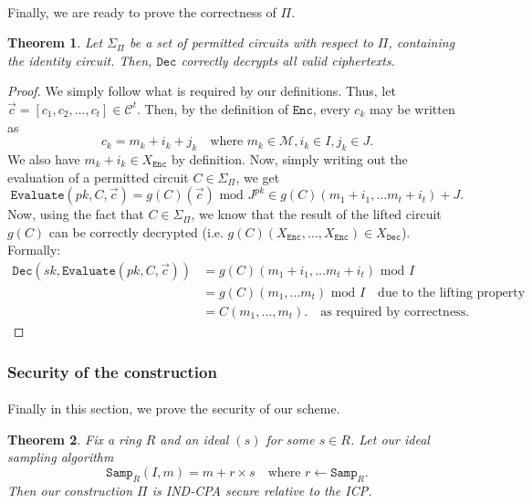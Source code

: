 \documentclass{article}
\newtheorem{theorem}{Theorem}[section]
\theoremstyle{definition}
\theoremstyle{example}
\newcommand{\Enc}{\texttt{Enc}}
\newcommand{\Dec}{\texttt{Dec}}
\newcommand{\Evaluate}{\texttt{Evaluate}}
\newcommand{\M}{\mathcal{M}}
\renewcommand{\C}{\mathcal{C}}
\renewcommand{\mod}{\,\,\text{mod}\,\,}
\newcommand{\Samp}{\texttt{Samp}}
\begin{document}
\paragraph{} Finally, we are ready to prove the correctness of $\Pi$.
\begin{theorem}
  Let $\Sigma_\Pi$ be a set of permitted circuits with respect to $\Pi$,
  containing the identity circuit. Then, $\Dec$ correctly decrypts all valid ciphertexts.
\end{theorem}
\begin{proof}
  We simply follow what is required by our definitions.
  Thus, let $\vec{c} = [c_1, c_2, \hdots, c_t] \in \C^t$. Then, by the
  definition of $\Enc$, every $c_k$ may be written as
  \[
    c_k = m_k + i_k + j_k\quad\text{where }m_k \in \M, i_k \in I, j_k \in J.
  \]
  We also have $m_k + i_k \in X_\Enc$ by definition. Now, simply writing out the
  evaluation of a permitted circuit $C \in \Sigma_\Pi$, we get
  \[
    \Evaluate(pk, C, \vec{c}) = g(C)(\vec{c}) \mod J^{pk} \in g(C)(m_1 + i_1,
    \hdots m_t + i_t) + J.
  \]
  Now, using the fact that $C \in \Sigma_\Pi$, we know that the result of the lifted circuit
  $g(C)$ can be correctly decrypted (i.e. $g(C)(X_\Enc, \hdots, X_\Enc) \in X_\Dec$). Formally:
  \begin{align*}
    \Dec(sk, \Evaluate(pk, C, \vec{c})) &= g(C)(m_1 + i_1,
                                          \hdots m_t + i_t) \mod I \\
                                        &= g(C)(m_1, \hdots m_t) \mod I\quad\text{due to the lifting property} \\
                                        &= C(m_1, \hdots, m_t).\quad \text{as required by correctness.}
  \end{align*}
\end{proof}
\subsubsection{Security of the construction}
\paragraph{} Finally in this section, we prove the security of our scheme.
\begin{theorem}
Fix a ring $R$ and an ideal $(s)$ for some $s \in R$. Let our ideal sampling algorithm
\[
  \Samp_R(I, m) = m + r \times s\quad\text{where } r \leftarrow \Samp_R.
\]
Then our construction $\Pi$ is IND-CPA secure relative to the ICP.
\end{theorem}
\end{document}
